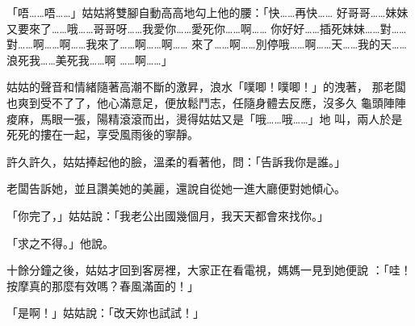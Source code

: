 「唔……唔……」姑姑將雙腳自動高高地勾上他的腰：「快……再快……
好哥哥……妹妹又要來了……哦……哥哥呀……我愛你……愛死你……啊……
你好好……插死妹妹……對……對……啊……啊……我來了……啊……啊……
來了……啊……別停哦……啊……天……我的天……浪死我……美死我……啊
……啊……」

姑姑的聲音和情緒隨著高潮不斷的激昇，浪水「噗唧！噗唧！」的洩著，
那老闆也爽到受不了了，他心滿意足，便放鬆鬥志，任隨身體去反應，沒多久
龜頭陣陣痠麻，馬眼一張，陽精滾滾而出，燙得姑姑又是「哦……哦……」地
叫，兩人於是死死的摟在一起，享受風雨後的寧靜。

許久許久，姑姑捧起他的臉，溫柔的看著他，問：「告訴我你是誰。」

老闆告訴她，並且讚美她的美麗，還說自從她一進大廳便對她傾心。

「你完了，」姑姑說：「我老公出國幾個月，我天天都會來找你。」

「求之不得。」他說。

十餘分鐘之後，姑姑才回到客房裡，大家正在看電視，媽媽一見到她便說
：「哇！按摩真的那麼有效嗎？春風滿面的！」

「是啊！」姑姑說：「改天妳也試試！」











